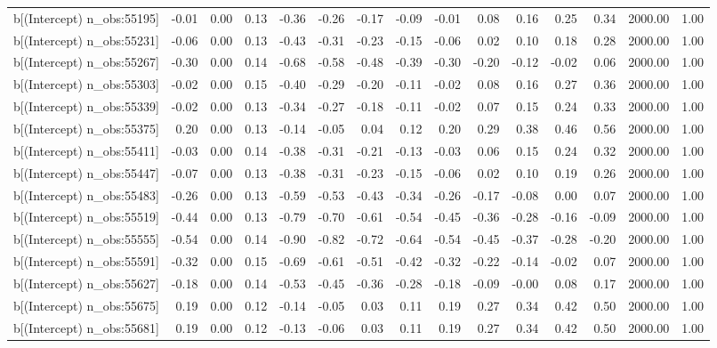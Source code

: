 \begin{table}[ht]
\begin{tabular}{rrrrrrrrrrrrrrr}
  b[(Intercept) n\_obs:55195] & -0.01 & 0.00 & 0.13 & -0.36 & -0.26 & -0.17 & -0.09 & -0.01 & 0.08 & 0.16 & 0.25 & 0.34 & 2000.00 & 1.00 \\ 
  b[(Intercept) n\_obs:55231] & -0.06 & 0.00 & 0.13 & -0.43 & -0.31 & -0.23 & -0.15 & -0.06 & 0.02 & 0.10 & 0.18 & 0.28 & 2000.00 & 1.00 \\ 
  b[(Intercept) n\_obs:55267] & -0.30 & 0.00 & 0.14 & -0.68 & -0.58 & -0.48 & -0.39 & -0.30 & -0.20 & -0.12 & -0.02 & 0.06 & 2000.00 & 1.00 \\ 
  b[(Intercept) n\_obs:55303] & -0.02 & 0.00 & 0.15 & -0.40 & -0.29 & -0.20 & -0.11 & -0.02 & 0.08 & 0.16 & 0.27 & 0.36 & 2000.00 & 1.00 \\ 
  b[(Intercept) n\_obs:55339] & -0.02 & 0.00 & 0.13 & -0.34 & -0.27 & -0.18 & -0.11 & -0.02 & 0.07 & 0.15 & 0.24 & 0.33 & 2000.00 & 1.00 \\ 
  b[(Intercept) n\_obs:55375] & 0.20 & 0.00 & 0.13 & -0.14 & -0.05 & 0.04 & 0.12 & 0.20 & 0.29 & 0.38 & 0.46 & 0.56 & 2000.00 & 1.00 \\ 
  b[(Intercept) n\_obs:55411] & -0.03 & 0.00 & 0.14 & -0.38 & -0.31 & -0.21 & -0.13 & -0.03 & 0.06 & 0.15 & 0.24 & 0.32 & 2000.00 & 1.00 \\ 
  b[(Intercept) n\_obs:55447] & -0.07 & 0.00 & 0.13 & -0.38 & -0.31 & -0.23 & -0.15 & -0.06 & 0.02 & 0.10 & 0.19 & 0.26 & 2000.00 & 1.00 \\ 
  b[(Intercept) n\_obs:55483] & -0.26 & 0.00 & 0.13 & -0.59 & -0.53 & -0.43 & -0.34 & -0.26 & -0.17 & -0.08 & 0.00 & 0.07 & 2000.00 & 1.00 \\ 
  b[(Intercept) n\_obs:55519] & -0.44 & 0.00 & 0.13 & -0.79 & -0.70 & -0.61 & -0.54 & -0.45 & -0.36 & -0.28 & -0.16 & -0.09 & 2000.00 & 1.00 \\ 
  b[(Intercept) n\_obs:55555] & -0.54 & 0.00 & 0.14 & -0.90 & -0.82 & -0.72 & -0.64 & -0.54 & -0.45 & -0.37 & -0.28 & -0.20 & 2000.00 & 1.00 \\ 
  b[(Intercept) n\_obs:55591] & -0.32 & 0.00 & 0.15 & -0.69 & -0.61 & -0.51 & -0.42 & -0.32 & -0.22 & -0.14 & -0.02 & 0.07 & 2000.00 & 1.00 \\ 
  b[(Intercept) n\_obs:55627] & -0.18 & 0.00 & 0.14 & -0.53 & -0.45 & -0.36 & -0.28 & -0.18 & -0.09 & -0.00 & 0.08 & 0.17 & 2000.00 & 1.00 \\ 
  b[(Intercept) n\_obs:55675] & 0.19 & 0.00 & 0.12 & -0.14 & -0.05 & 0.03 & 0.11 & 0.19 & 0.27 & 0.34 & 0.42 & 0.50 & 2000.00 & 1.00 \\ 
  b[(Intercept) n\_obs:55681] & 0.19 & 0.00 & 0.12 & -0.13 & -0.06 & 0.03 & 0.11 & 0.19 & 0.27 & 0.34 & 0.42 & 0.50 & 2000.00 & 1.00 \\ 

\end{tabular}
\end{table}
